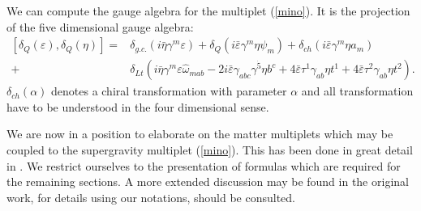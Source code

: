 \documentclass[a4paper,12pt, twoside]{article}
\numberwithin{equation}{section}
\begin{document}
We can compute the gauge algebra for the multiplet (\ref{mino}). It is 
the projection of the five dimensional gauge algebra:
\begin{equation}
\begin{split}
[\delta_Q(\varepsilon),\delta _Q (\eta)]  = &  
\delta_{g.c.}(i\bar{\eta}\gamma^m\varepsilon)+\delta_Q(i\bar{\varepsilon}\gamma^m\eta\psi_m)+\delta_{ch}(i\bar{\varepsilon}\gamma^m\eta 
a_m)\\ 
+ & 
\delta_{Lt}(i\bar{\eta}\gamma^m\varepsilon\widehat{\omega}_{mab}-2i\bar{\varepsilon}\gamma_{abc}\gamma^{\dot{5}}\eta 
b^c+4\bar{\varepsilon}\tau^1\gamma_{ab}\eta t^1+4\bar{\varepsilon}\tau^2\gamma_{ab}\eta 
t^2).\label{algorbi}
\end{split}
\end{equation}
$\delta_{ch}(\alpha)$ denotes a chiral transformation with parameter 
$\alpha$ and all transformation have to be understood in the four 
dimensional sense.

We are now in a position to elaborate on the matter multiplets which 
may be coupled to the supergravity multiplet (\ref{mino}). This has been 
done in great detail in \cite{Sohnius:1983xs}. We restrict ourselves to 
the presentation of formulas which are required for the remaining 
sections. A more extended discussion may be found in the original work, for 
details using our notations, \cite{diss} should be consulted.
\end{document}
